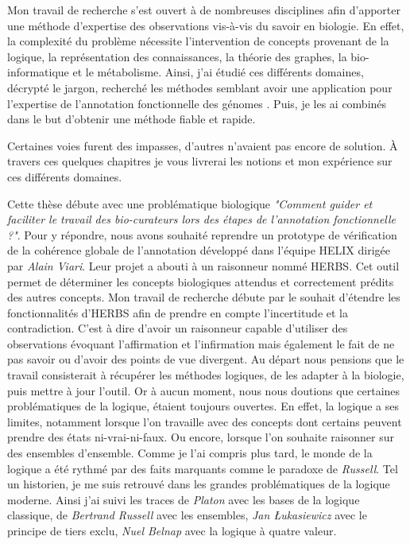 \begin{refsegment}
Mon travail de recherche s'est ouvert à de nombreuses disciplines afin d'apporter une méthode d'expertise des observations vis-à-vis du savoir en biologie. En effet, la complexité du problème nécessite l'intervention de concepts provenant de la logique, la représentation des connaissances, la théorie des graphes, la bio-informatique et le métabolisme. Ainsi, j'ai étudié ces différents domaines, décrypté le jargon, recherché les méthodes semblant avoir une application pour l'expertise de l'annotation fonctionnelle des génomes . Puis, je les ai combinés dans le but d'obtenir une méthode fiable et rapide.

Certaines voies furent des impasses, d'autres n'avaient pas encore de solution. À travers ces quelques chapitres je vous livrerai les notions et mon expérience sur ces différents domaines.

Cette thèse débute avec une problématique biologique \textit{"Comment guider et faciliter le travail des bio-curateurs lors des étapes de l'annotation fonctionnelle ?"}. Pour y répondre, nous avons souhaité reprendre un prototype de vérification de la cohérence globale de l'annotation développé dans l'équipe HELIX dirigée par \textit{Alain Viari}. Leur projet a abouti à un raisonneur nommé \gls{HERBS}. Cet outil permet de déterminer les concepts biologiques attendus et correctement prédits des autres concepts. Mon travail de recherche débute par le souhait d'étendre les fonctionnalités d'\gls{HERBS} afin de prendre en compte l'incertitude et la contradiction. C'est à dire d'avoir un raisonneur capable d'utiliser des observations évoquant l'affirmation et l'infirmation mais également le fait de ne pas savoir ou d'avoir des points de vue divergent. Au départ nous pensions que le travail consisterait à récupérer les méthodes logiques, de les adapter à la biologie, puis mettre à jour l'outil. Or à aucun moment, nous nous doutions que certaines problématiques de la logique, étaient toujours ouvertes. En effet, la logique a ses limites, notamment lorsque l'on travaille avec des concepts dont certains peuvent prendre des états ni-vrai-ni-faux. Ou encore, lorsque l'on souhaite raisonner sur des ensembles d'ensemble. Comme je l'ai compris plus tard, le monde de la logique a été rythmé par des faits marquants comme le paradoxe de \textit{Russell}. Tel un historien, je me suis retrouvé dans les grandes problématiques de la logique moderne. Ainsi j'ai suivi les traces de \textit{Platon} avec les bases de la logique classique, de \textit{Bertrand Russell} avec les ensembles, \textit{Jan Łukasiewicz} avec le principe de tiers exclu, \textit{Nuel Belnap} avec la logique à quatre valeur.


\end{refsegment}
